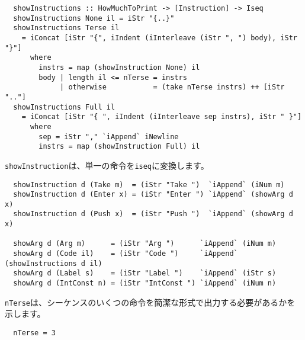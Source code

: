 \documentclass{jarticle}
\begin{document}
\begin{verbatim}
  showInstructions :: HowMuchToPrint -> [Instruction] -> Iseq
  showInstructions None il = iStr "{..}"
  showInstructions Terse il
    = iConcat [iStr "{", iIndent (iInterleave (iStr ", ") body), iStr "}"]
      where
        instrs = map (showInstruction None) il
        body | length il <= nTerse = instrs
             | otherwise           = (take nTerse instrs) ++ [iStr ".."]
  showInstructions Full il
    = iConcat [iStr "{ ", iIndent (iInterleave sep instrs), iStr " }"]
      where
        sep = iStr "," `iAppend` iNewline
        instrs = map (showInstruction Full) il
\end{verbatim}

\texttt{showInstruction}は、単一の命令を\texttt{iseq}に変換します。

\begin{verbatim}
  showInstruction d (Take m)  = (iStr "Take ")  `iAppend` (iNum m)
  showInstruction d (Enter x) = (iStr "Enter ") `iAppend` (showArg d x)
  showInstruction d (Push x)  = (iStr "Push ")  `iAppend` (showArg d x)

  showArg d (Arg m)      = (iStr "Arg ")      `iAppend` (iNum m)
  showArg d (Code il)    = (iStr "Code ")     `iAppend` (showInstructions d il)
  showArg d (Label s)    = (iStr "Label ")    `iAppend` (iStr s)
  showArg d (IntConst n) = (iStr "IntConst ") `iAppend` (iNum n)
\end{verbatim}

\texttt{nTerse}は、シーケンスのいくつの命令を簡潔な形式で出力する必要があるかを示します。

\begin{verbatim}
  nTerse = 3
\end{verbatim}
\end{document}
